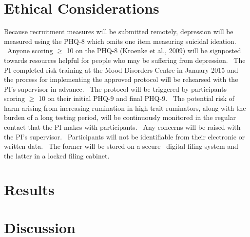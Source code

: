\documentclass[man,a4paper,biblatex]{apa6}
\begin{document}
\section{Ethical Considerations}
Because recruitment measures will be submitted remotely, depression will
be measured using the PHQ-8 which omits one item measuring suicidal
ideation. \ Anyone scoring ${\geq}$ 10 on the PHQ-8 (Kroenke et al.,
2009) will be signposted towards resources helpful for people who may be
suffering from depression. \ The PI completed risk training at the Mood
Disorders Centre in January 2015 and the process for implementing the
approved protocol will be rehearsed with the PI's supervisor in advance. \
The protocol will be triggered by participants scoring ${\geq}$ 10 on
their initial PHQ-9 and final PHQ-9. \ The potential risk of harm arising
from increasing rumination in high trait ruminators, along with the burden
of a long testing period, will be continuously monitored in the regular
contact that the PI makes with participants. \ Any concerns will be
raised with the PI's supervisor. \ Participants will not be identifiable
from their electronic or written data. \ The former will be stored on a
secure \ digital filing system and the latter in a locked filing cabinet.


\section{Results}

\section{Discussion}

\printbibliography
\end{document}
